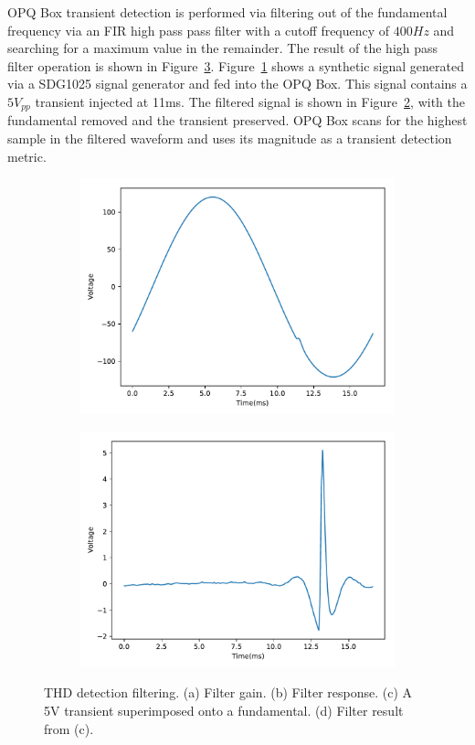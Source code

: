 OPQ Box transient detection is performed via filtering out of the fundamental frequency via an FIR high pass pass filter with a cutoff frequency of $400Hz$ and searching for a maximum value in the remainder.
The result of the high pass filter operation is shown in Figure~\ref{fig:opq:8}.
Figure~\ref{fig:opq:8:3} shows a synthetic signal generated via a SDG1025 signal generator and fed into the OPQ Box.
This signal contains a $5V_{pp}$ transient injected at 11ms.
The filtered signal is shown in Figure~\ref{fig:opq:8:4}, with the fundamental removed and the transient preserved.
OPQ Box scans for the highest sample in the filtered waveform and uses its magnitude as a transient detection metric.


\begin{figure}[ht]
	\centering
	\begin{subfigure}{.5\textwidth}
		\centering
		\includegraphics[width=0.86\linewidth]{images/opq-box/box_eval/5v_transient.pdf}
		\caption{}
		\label{fig:opq:8:3}
	\end{subfigure}%
	\begin{subfigure}{.5\textwidth}
		\centering
		\includegraphics[width=0.86\linewidth]{images/opq-box/box_eval/5v_transient_filtered.pdf}
		\caption{}
		\label{fig:opq:8:4}
	\end{subfigure}
	\caption{THD detection filtering. (a) Filter gain. (b) Filter response. (c) A 5V transient superimposed onto a fundamental. (d) Filter result from (c).}
	\label{fig:opq:8}
\end{figure}

